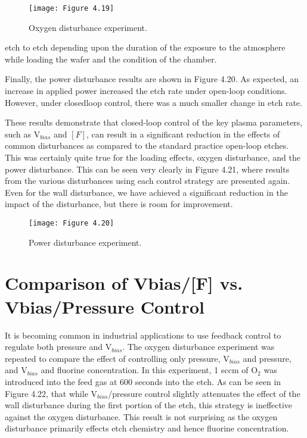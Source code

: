 \begin{figure}[H]
	\centering
	\texttt{[image: Figure 4.19]}
	\bf\caption{  Oxygen disturbance experiment.}
	\label{fig:4.19}
\end{figure}

\noindent etch to etch depending upon the duration of the exposure to the
atmosphere while loading the wafer and the condition of the chamber.

Finally, the power disturbance results are shown in Figure 4.20. As expected, an increase
in applied power increased the etch rate under open-loop conditions. However, under closedloop control, there was a much smaller change in etch rate.

These results demonstrate that closed-loop control of the key plasma parameters, such
as $\text{V}_{bias}$ and $[F]$, can result in a significant reduction in the effects of common disturbances as compared to the standard practice open-loop etches. This was certainly quite true for the loading effects, oxygen disturbance, and the power disturbance. This can be seen very clearly in Figure 4.21, where results from the various disturbances using each control strategy are presented again. Even for the wall disturbance, we have achieved a significant reduction in the impact of the disturbance, but there is room for improvement.

\begin{figure}[H]
	\centering
	\texttt{[image: Figure 4.20]}
	\bf\caption{  Power disturbance experiment.}
	\label{fig:4.20}
\end{figure}

\section{Comparison of Vbias/[F] vs. Vbias/Pressure Control}

\tab It is becoming common in industrial applications to use feedback control to regulate
both pressure and $\text{V}_{bias}$. The oxygen disturbance experiment was repeated to compare the effect of controlling only pressure, $\text{V}_{bias}$ and pressure, and $\text{V}_{bias}$ and fluorine concentration. In this experiment, 1 sccm of $\text{O}_{2}$ was introduced into the feed gas at 600 seconds into the etch. As can be seen in Figure 4.22, that while $\text{V}_{bias}$/pressure control slightly attenuates the effect of the wall disturbance during the first portion of the etch, this strategy is ineffective against the oxygen disturbance. This result is not surprising as the oxygen disturbance primarily effects etch chemistry and hence fluorine concentration.


